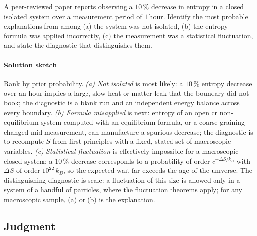 \begin{exercise}
A peer-reviewed paper reports observing a $10\,\%$ decrease in
entropy in a closed isolated system over a measurement period of
$1\,\text{hour}$. Identify the most probable explanations from among
(a) the system was not isolated, (b) the entropy formula was applied
incorrectly, (c) the measurement was a statistical fluctuation, and
state the diagnostic that distinguishes them.

\paragraph{Solution sketch.} Rank by prior probability. \emph{(a) Not
isolated} is most likely: a $10\,\%$ entropy decrease over an hour
implies a large, slow heat or matter leak that the boundary did not
book; the diagnostic is a blank run and an independent energy balance
across every boundary. \emph{(b) Formula misapplied} is next: entropy of
an open or non-equilibrium system computed with an equilibrium formula,
or a coarse-graining changed mid-measurement, can manufacture a spurious
decrease; the diagnostic is to recompute $S$ from first principles with
a fixed, stated set of macroscopic variables. \emph{(c) Statistical
fluctuation} is effectively impossible for a macroscopic closed system:
a $10\,\%$ decrease corresponds to a probability of order
$e^{-\Delta S/k_B}$ with $\Delta S$ of order $10^{22}\,k_B$, so the
expected wait far exceeds the age of the universe. The distinguishing
diagnostic is scale: a fluctuation of this size is allowed only in a
system of a handful of particles, where the fluctuation theorems apply;
for any macroscopic sample, (a) or (b) is the explanation.
\end{exercise}

\subsection*{Judgment}

